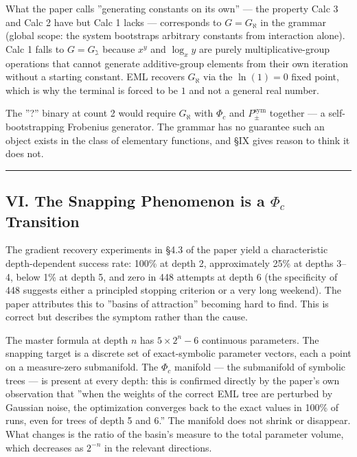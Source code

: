 \documentclass[12pt,a4paper]{article}
\newcommand{\pilcrow}{\S}
\begin{document}
What the paper calls ''generating constants on its own'' --- the property Calc 3 and
Calc 2 have but Calc 1 lacks --- corresponds to $G = G_{\aleph}$ in the grammar
(global scope: the system bootstraps arbitrary constants from interaction alone).
Calc 1 falls to $G = G_{\gimel}$ because $x^y$ and $\log_x y$ are purely
multiplicative-group operations that cannot generate additive-group elements from
their own iteration without a starting constant. EML recovers $G_{\aleph}$ via the
$\ln(1) = 0$ fixed point, which is why the terminal is forced to be $1$ and not a
general real number.

The ''?'' binary at count 2 would require $G_{\aleph}$ with $\Phi_c$ and
$P_{\pm}^{\text{sym}}$ together --- a self-bootstrapping Frobenius generator. The
grammar has no guarantee such an object exists in the class of elementary
functions, and \pilcrow{}IX gives reason to think it does not.

\begin{center}
\rule{0.5\textwidth}{0.4pt}
\end{center}

\subsection{VI. The Snapping Phenomenon is a $\Phi_c$ Transition}

The gradient recovery experiments in \pilcrow{}4.3 of the paper yield a characteristic
depth-dependent success rate: 100\% at depth 2, approximately 25\% at depths 3--4,
below 1\% at depth 5, and zero in 448 attempts at depth 6 (the specificity of
448 suggests either a principled stopping criterion or a very long weekend).
The paper attributes this to ''basins of attraction'' becoming hard to find. This is correct but
describes the symptom rather than the cause.

The master formula at depth $n$ has $5 \times 2^n - 6$ continuous parameters.
The snapping target is a discrete set of exact-symbolic parameter vectors, each
a point on a measure-zero submanifold. The $\Phi_c$ manifold --- the submanifold
of symbolic trees --- is present at every depth: this is confirmed directly by the
paper's own observation that ''when the weights of the correct EML tree are
perturbed by Gaussian noise, the optimization converges back to the exact values
in 100\% of runs, even for trees of depth 5 and 6.'' The manifold does not shrink
or disappear. What changes is the ratio of the basin's measure to the total
parameter volume, which decreases as $2^{-n}$ in the relevant directions.
\end{document}
